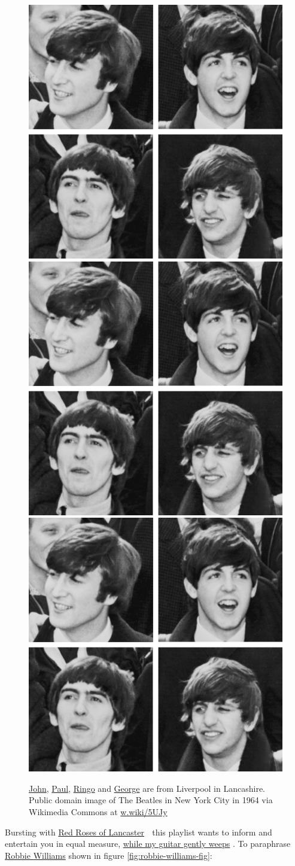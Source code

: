 \documentclass[
]{book}
\begin{document}
\begin{figure}
\includegraphics[width=0.33\linewidth]{images/the-beatles} \includegraphics[width=0.33\linewidth]{images/the-beatles} \includegraphics[width=0.33\linewidth]{images/the-beatles} \caption{\href{https://en.wikipedia.org/wiki/John_Lennon}{John}, \href{https://en.wikipedia.org/wiki/Paul_McCartney}{Paul}, \href{https://en.wikipedia.org/wiki/Ringo_Starr}{Ringo} and \href{https://en.wikipedia.org/wiki/George_Harrison}{George} are from Liverpool in Lancashire. Public domain image of The Beatles in New York City in 1964 via Wikimedia Commons at \href{https://w.wiki/5UJy}{w.wiki/5UJy}}\label{fig:the-beatles-fig}
\end{figure}



Bursting with \href{https://en.wikipedia.org/wiki/Red_Rose_of_Lancaster}{Red Roses of Lancaster} 🌹 this playlist wants to inform and entertain you in equal measure, \href{https://en.wikipedia.org/wiki/While_My_Guitar_Gently_Weeps}{while my guitar gently weeps} \citep{weeps}. To paraphrase \href{https://en.wikipedia.org/wiki/Robbie_Williams}{Robbie Williams} shown in figure \ref{fig:robbie-williams-fig}:
\end{document}
